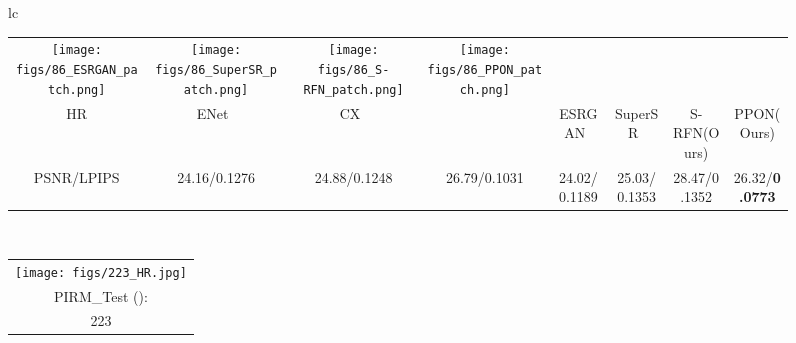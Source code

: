 \documentclass[preprint]{elsarticle}
\begin{document}
\begin{figure*}[htpb]
{\begin{tabular}{lc}
\begin{adjustbox}{valign=t}
\begin{tabular}{cccccccc}
					\texttt{[image: figs/86\_ESRGAN\_patch.png]} &
					\hspace{-3mm}
					\texttt{[image: figs/86\_SuperSR\_patch.png]} &
					\hspace{-3mm}
					\texttt{[image: figs/86\_S-RFN\_patch.png]} &
					\hspace{-3mm}
					\texttt{[image: figs/86\_PPON\_patch.png]} \\
					HR & \hspace{-3mm} ENet~\cite{EnhanceNet} & \hspace{-3mm} CX~\cite{CX} & \hspace{-3mm} ~\cite{EPSR} &
					\hspace{-3mm} ESRGAN~\cite{ESRGAN} & \hspace{-3mm} SuperSR~\cite{ESRGAN} & \hspace{-3mm} S-RFN(Ours) & \hspace{-3mm} PPON(Ours) \\
					PSNR/LPIPS & \hspace{-3mm} 24.16/0.1276 & \hspace{-3mm} 24.88/0.1248 & \hspace{-3mm} 26.79/0.1031 & \hspace{-3mm} 24.02/0.1189 & \hspace{-3mm} 25.03/0.1353 & \hspace{-3mm} 28.47/0.1352 & \hspace{-3mm} 26.32/\textbf{0.0773} \\
				\end{tabular}
			\end{adjustbox}
			\\
			\begin{adjustbox}{valign=t}
				\scriptsize
				\begin{tabular}{c}
					\texttt{[image: figs/223\_HR.jpg]} \\
					PIRM\_Test (): \\
					223 \\
				\end{tabular}
			\end{adjustbox}
			\hspace{-3mm}
			\begin{adjustbox}{valign=t}
				\scriptsize
				\begin{tabular}{cccccccc}

\end{tabular}
\end{adjustbox}
\end{tabular}}
\end{figure*}
\end{document}

